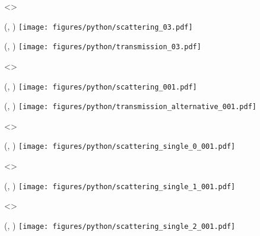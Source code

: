 \visible<\SLIDERESOLUTIONFOUR>{
    \begin{textblock}{\SPECTRUMWIDTH}(\SCASPECTRUMX, \SPECTRUMY)
        \texttt{[image: figures/python/scattering\_03.pdf]}
    \end{textblock}

    \begin{textblock}{\SPECTRUMWIDTH}(\TRASPECTRUMX, \SPECTRUMY)
        \texttt{[image: figures/python/transmission\_03.pdf]}
    \end{textblock}
}

\visible<\SLIDEALTERNATIVE>{
    \begin{textblock}{\SPECTRUMWIDTH}(\SCASPECTRUMX, \SPECTRUMY)
        \texttt{[image: figures/python/scattering\_001.pdf]}
    \end{textblock}

    \begin{textblock}{\SPECTRUMWIDTH}(\TRASPECTRUMX, \SPECTRUMY)
        \texttt{[image: figures/python/transmission\_alternative\_001.pdf]}
    \end{textblock}
}

\visible<\SLIDELASERRED>{
    \begin{textblock}{\SPECTRUMWIDTH}(\SCASPECTRUMX, \SPECTRUMY)
        \texttt{[image: figures/python/scattering\_single\_0\_001.pdf]}
    \end{textblock}    
}

\visible<\SLIDELASERORANGE>{
    \begin{textblock}{\SPECTRUMWIDTH}(\SCASPECTRUMX, \SPECTRUMY)
        \texttt{[image: figures/python/scattering\_single\_1\_001.pdf]}
    \end{textblock}    
}

\visible<\SLIDELASERGREEN>{
    \begin{textblock}{\SPECTRUMWIDTH}(\SCASPECTRUMX, \SPECTRUMY)
        \texttt{[image: figures/python/scattering\_single\_2\_001.pdf]}
    \end{textblock}    
}